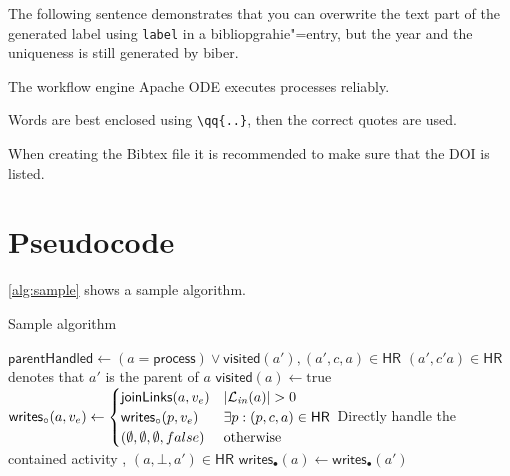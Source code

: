 The following sentence demonstrates that you can overwrite the text part of the generated label using \texttt{label} in a bibliopgrahie"=entry, but the year and the uniqueness is still generated by biber.

\begin{filecontents*}{\democodefile}
The workflow engine Apache ODE \cite{ApacheODE} executes \BPEL processes reliably.
\end{filecontents*}

\begin{filecontents*}{\democodefile}
Words are best enclosed using \texttt{\textbackslash qq\{..\}}, then the correct quotes are used.
\end{filecontents*}

When creating the Bibtex file it is recommended to make sure that the DOI is listed.





\section{Pseudocode}
\autoref{alg:sample} shows a sample algorithm.
\begin{Algorithmus} %
  \caption{Sample algorithm}
  \label{alg:sample}
  \begin{algorithmic}
\State $\mathsf{parentHandled} \gets (a = \mathsf{process}) \lor \mathsf{visited}(a'), (a',c,a) \in \mathsf{HR}$
\State \Comment $(a',c'a) \in \mathsf{HR}$ denotes that $a'$ is the parent of $a$
\State $\mathsf{visited}(a) \gets \text{true}$
\State $\mathsf{writes}_\circ(a,v_e) \gets
\begin{cases}
\mathsf{joinLinks}(a,v_e) & \left\lvert\mathcal{L}_\mathit{in}(a)\right\rvert > 0\\
\mathsf{writes}_\circ(p,v_e)
& \exists p: (p,c,a) \in \mathsf{HR}\\
(\emptyset, \emptyset, \emptyset, false) & \text{otherwise}
\end{cases}
$
  \State {}
  \State {}
 \Comment Directly handle the contained activity
  \State {}, $(a,\bot,a') \in \mathsf{HR}$
  \State $\mathsf{writes}_\bullet(a) \gets \mathsf{writes}_\bullet(a')$
\EndIf
{}
  \State {}
\EndFor
\EndIf
\EndProcedure
  \end{algorithmic}
\end{Algorithmus}

